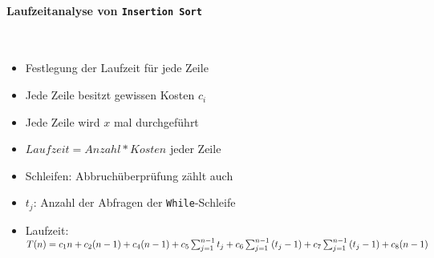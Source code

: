 \documentclass[
    ngerman,
    color=3b,
    dark_mode,
    load_common, %
    summary,
    boxarc,
]{rubos-tuda-template}
\begin{document}
\paragraph{Laufzeitanalyse von \texttt{Insertion Sort}} {\label{insSortLaufzeit}}\mbox{}
\vspace*{1em}\\
\begin{minipage}[c]{0.3\textwidth}
    \mbox{}
    \centering
    \resetrc
    \label{tab:insertion-sort:laufzeit}
\end{minipage}
\begin{minipage}[c]{0.6\textwidth}
    \begin{itemize}
        \item Festlegung der Laufzeit für jede Zeile
        \item Jede Zeile besitzt gewissen Kosten \texttt{$c_i$}
        \item Jede Zeile wird $x$ mal durchgeführt
        \item $Laufzeit = Anzahl * Kosten$ jeder Zeile
        \item Schleifen: Abbruchüberprüfung zählt auch
        \item \texttt{$t_j$}: Anzahl der Abfragen der \texttt{While}-Schleife
        \item Laufzeit:
              $T(n)=c_{1} n+c_{2}(n-1)+c_{4}(n-1)+c_{5} \sum_{j=1}^{n-1} t_{j}\\ +c_{6} \sum_{j=1}^{n-1}\left(t_{j}-1\right)+c_{7} \sum_{j=1}^{n-1}\left(t_{j}-1\right)+c_{8}(n-1)$
    \end{itemize}
\end{minipage}
\end{document}
